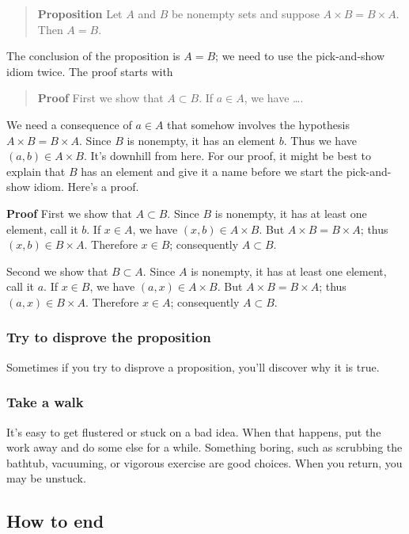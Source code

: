\documentclass[12pt,fleqn]{article}
\newcounter{ex}\setcounter{ex}{0}
\newcounter{id}\setcounter{id}{0}
\newcounter{se}\setcounter{se}{0}
\begin{document}
\begin{quote}
\textbf{Proposition} Let \(A\) and \(B\) be nonempty sets and suppose \mbox{\(A \times B
= B \times A\)}.  Then \(A = B\).
\end{quote}
The conclusion of the proposition is \(A = B\); we need to use the 
pick-and-show idiom twice. The proof starts with
\begin{quote}
 \textbf{Proof}  First we show that \(A \subset B\). If \(a \in A\), we have \dots. 
\end{quote}
We need a consequence of \(a \in A\) that somehow involves the
hypothesis \mbox{\(A \times B = B \times A\)}.  Since \(B\) is
nonempty, it has an element \(b\). Thus we have \((a,b) \in A \times
B\).  It's downhill from here. For our proof, it might be best to
explain that \(B\) has an element and give it a name before we start
the pick-and-show idiom.  Here's a proof.




 \textbf{Proof} First we show that \(A \subset B\). Since \(B\) is
 nonempty, it has at least one element, call it \(b\). If \(x \in A\), we
 have \((x,b) \in A \times B\).  But \mbox{\(A \times B = B \times A\)};
 thus \((x,b) \in B \times A\).  Therefore \(x \in B\); consequently
\(A \subset B\).

Second we show that \(B \subset A\).  Since \(A\) is
 nonempty, it has at least one element, call it \(a\). If \(x \in B\), we
 have \((a,x) \in A \times B\).  But \(A \times B = B \times A\);
 thus \((a,x) \in B \times A\).  Therefore \(x \in A\); consequently
\(A \subset B\).

\subsubsection{Try to disprove the proposition} 
 
 Sometimes if you try to disprove a proposition, you'll discover why
 it is true.
 
 \subsubsection{Take a walk}  It's easy to get flustered or stuck on a bad idea.  When that happens,
 put the work away and do some else for a while. Something boring, such as
 scrubbing the bathtub, vacuuming,  or vigorous exercise are good choices.
  When you return, you may be unstuck.

\subsection{How to end}
\end{document}
